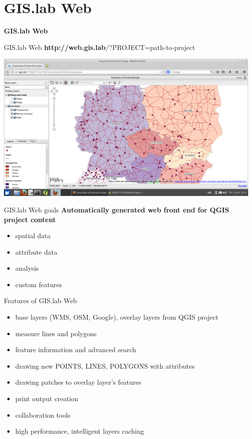 \documentclass[12pt]{beamer}
\begin{document}
\section{GIS.lab Web}
\begin{frame}
	\begin{center}
		\LARGE\textbf{GIS.lab Web}
	\end{center}
\end{frame}


\begin{frame}{GIS.lab Web}
	\textbf{http://web.gis.lab}/?PROJECT=path-to-project
	\begin{center}
		\includegraphics[keepaspectratio=true,height=0.7\textheight]{images/rapid-gis-deployment/project-gislab-web.png}
	\end{center}
\end{frame}


\begin{frame}{GIS.lab Web goals}
	\textbf{Automatically generated web front end for QGIS project content}
	\begin{itemize}
		\item spatial data
		\item attribute data
		\item analysis
		\item custom features
	\end{itemize}
\end{frame}


\begin{frame}{Features of GIS.lab Web}
	\begin{itemize}[<+->]
		\item base layers (WMS, OSM, Google), overlay layers from QGIS project
		\item measure lines and polygons
		\item feature information and advanced search
		\item drawing new POINTS, LINES, POLYGONS with attributes
		\item drawing patches to overlay layer's features
		\item print output creation
		\item collaboration tools
		\item high performance, intelligent layers caching
	\end{itemize}
\end{frame}
\end{document}
